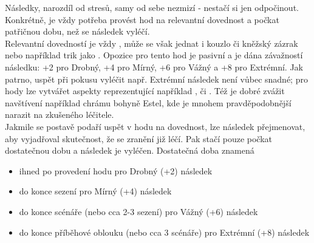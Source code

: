 Následky, narozdíl od stresů, samy od sebe nezmizí - nestačí si jen odpočinout. Konkrétně, je vždy potřeba provést hod na relevantní dovednost a počkat patřičnou dobu, než se následek vyléčí.\\
Relevantní dovedností je vždy , může se však jednat i kouzlo či kněžský zázrak nebo například trik jako . Opozice pro tento hod je pasivní a je dána závažností následku: +2 pro Drobný, +4 pro Mírný, +6 pro Vážný a +8 pro Extrémní. Jak patrno, uspět při pokusu vyléčit např. Extrémní následek není vůbec snadné; pro hody lze vytvářet aspekty reprezentující například ,  či . Též je dobré zvážit navštívení například chrámu bohyně Estel, kde je mnohem pravděpodobnější narazit na zkušeného léčitele.\\
Jakmile se postavě podaří uspět v hodu na dovednost, lze následek přejmenovat, aby vyjadřoval skutečnost, že se zranění již léčí. Pak stačí pouze počkat dostatečnou dobu a následek je vyléčen. Dostatečná doba znamená

\begin{itemize}
\item ihned po provedení hodu pro Drobný (+2) následek
\item do konce sezení pro Mírný (+4) následek
\item do konce scénáře (nebo cca 2-3 sezení) pro Vážný (+6) následek
\item do konce příběhové oblouku (nebo cca 3 scénáře) pro Extrémní (+8) následek
\end{itemize}





